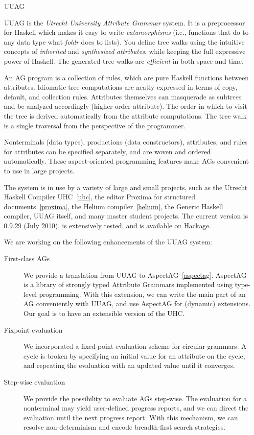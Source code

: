 \begin{hcarentry}[updated]{UUAG}
\label{uuag}
\makeheader

UUAG is the \emph{Utrecht University Attribute Grammar} system. It is a preprocessor for Haskell which makes it easy to write \emph{catamorphisms} (i.e., functions that do to any data type what \emph{foldr} does to lists). You define tree walks using the intuitive concepts of \emph{inherited} and \emph{synthesized attributes}, while keeping the full expressive power of Haskell. The generated tree walks are \emph{efficient} in both space and time.

An AG program is a collection of rules, which are pure Haskell functions between attributes.
Idiomatic tree computations are neatly expressed in terms of copy, default, and collection rules. Attributes themselves can masquerade as subtrees and be analyzed accordingly (higher-order attribute). The order in which to visit the tree is derived automatically from the attribute computations. The tree walk is a single traversal from the perspective of the programmer.

Nonterminals (data types), productions (data constructors), attributes, and rules for attributes can be specified separately, and are woven and ordered automatically. These aspect-oriented programming features make AGs convenient to use in large projects.

The system is in use by a variety of large and small projects, such as the Utrecht Haskell Compiler UHC~\cref{uhc}, the editor Proxima for structured documents~\cref{proxima}, the Helium compiler~\cref{helium}, the Generic Haskell compiler, UUAG itself, and many master student projects. The current version is 0.9.29 (July 2010), is extensively tested, and is available on Hackage.

We are working on the following enhancements of the UUAG system:
\begin{description}
\item[First-class AGs]
  We provide a translation from UUAG to AspectAG~\cref{aspectag}.
  AspectAG is a library of strongly typed Attribute Grammars
  implemented using type-level programming. With this extension, we can write the main part of
  an AG conveniently with UUAG, and use AspectAG for (dynamic) extensions. Our goal is to have
  an extensible version of the UHC.
\item[Fixpoint evaluation]
    We incorporated a fixed-point evaluation scheme for circular grammars.
    A cycle is broken by specifying an initial value for an attribute on the
    cycle, and repeating the evaluation with an updated value until it converges.
\item[Step-wise evaluation]
  We provide the possibility to evaluate AGs step-wise. The evaluation for a nonterminal may
  yield user-defined progress reports, and we can direct the evaluation until the next
  progress report. With this mechanism, we can resolve non-determinism and encode breadth-first
  search strategies.
\end{description}


\end{hcarentry}
